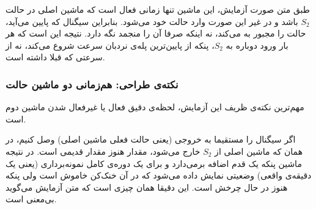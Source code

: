 \documentclass[10pt,a4paper]{article}
\begin{document}
\begin{center}
\begin{latin}
\end{latin}
\end{center}

طبق متن صورت آزمایش، این ماشین تنها زمانی فعال است که ماشین اصلی در حالت $S_2$ باشد و در غیر این صورت {وارد حالت  خود می‌شود}. بنابراین سیگنال  که پایین می‌آید، حالت را {مجبور} به  می‌کند، نه اینکه صرفا آن را منجمد نگه دارد. نتیجه این است که هر بار ورود دوباره به $S_2$، پنکه از پایین‌ترین پله‌ی نردبان سرعت شروع می‌کند، نه از سرعتی که قبلا داشته است.

\begin{latin}

\end{latin}

\subsubsection*{نکته‌ی طراحی: هم‌زمانی دو ماشین حالت}

مهم‌ترین نکته‌ی ظریف این آزمایش، {لحظه‌ی دقیق} فعال یا غیرفعال شدن ماشین دوم است.

اگر سیگنال  را مستقیما به خروجی  (یعنی {حالت فعلی} ماشین اصلی) وصل کنیم، در همان  که ماشین اصلی از $S_2$ خارج می‌شود، مقدار  هنوز مقدار قدیمی است. در نتیجه ماشین پنکه یک قدم {اضافه} برمی‌دارد و برای یک دوره‌ی کامل نمونه‌برداری (یعنی یک دقیقه‌ی واقعی) وضعیتی نمایش داده می‌شود که در آن خنک‌کن خاموش است ولی پنکه هنوز در حال چرخش است. این دقیقا همان چیزی است که متن آزمایش می‌گوید بی‌معنی است.
\end{document}
